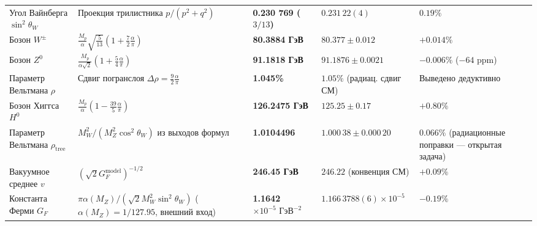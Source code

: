\documentclass[11pt,a4paper]{article}
\theoremstyle{definition}
\theoremstyle{remark}
\begin{document}
\begin{xltabular}{\textwidth}{>{\raggedright\arraybackslash}p{3.2cm} X >{\centering\arraybackslash}p{2.7cm} >{\centering\arraybackslash}p{3.0cm} >{\raggedleft\arraybackslash}p{2.1cm}}
 \\
\midrule
Угол Вайнберга $\sin^2\theta_W$ & Проекция трилистника $p/(p^2+q^2)$ & \textbf{0.230 769 ($3/13$)} & $0.231\,22(4)$ & $0.19\%$ \\
Бозон $W^\pm$ & $\frac{M_p}{\alpha}\sqrt{\frac{5}{13}}(1 + \frac{7}{2}\frac{\alpha}{\pi})$ & \textbf{80.3884 ГэВ} & $80.377 \pm 0.012$ & $+0.014\%$ \\
Бозон $Z^0$ & $\frac{M_p}{\alpha\sqrt{2}}(1 + \frac{5}{4}\frac{\alpha}{\pi})$ & \textbf{91.1818 ГэВ} & $91.1876 \pm 0.0021$ & $\mathbf{-0.006\%}$ ($-64\text{ ppm}$) \\
Параметр Вельтмана $\rho$ & Сдвиг погранслоя $\Delta\rho = \frac{9}{2}\frac{\alpha}{\pi}$ & \textbf{1.045\%} & $1.05\%$ (радиац. сдвиг СМ) & Выведено дедуктивно \\
Бозон Хиггса $H^0$ & $\frac{M_p}{\alpha}(1 - \frac{39}{5}\frac{\alpha}{\pi})$ & \textbf{126.2475 ГэВ} & $125.25 \pm 0.17$ & $+0.80\%$ \\
Параметр Вельтмана $\rho_{\mathrm{tree}}$ & $M_W^2 / (M_Z^2 \cos^2\theta_W)$ из выходов формул & \textbf{1.0104496} & $1.000\,38 \pm 0.000\,20$ & $0.066\%$ (радиационные поправки — открытая задача) \\
Вакуумное среднее $v$ & $(\sqrt{2} G_F^{\mathrm{model}})^{-1/2}$ & \textbf{246.45 ГэВ} & $246.22$ (конвенция СМ) & $+0.09\%$ \\
Константа Ферми $G_F$ & $\pi\alpha(M_Z) / (\sqrt{2} M_W^2 \sin^2\theta_W)$ ($\alpha(M_Z)=1/127.95$, внешний вход) & \textbf{1.1642 $\times 10^{-5}\text{ ГэВ}^{-2}$} & $1.166\,3788(6) \times 10^{-5}$ & $-0.19\%$ \\
\midrule


\end{xltabular}
\end{document}
